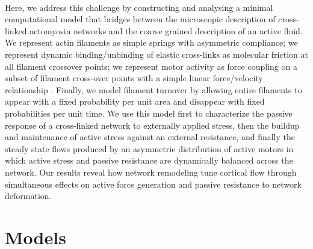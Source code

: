 \documentclass[10pt,letterpaper]{article}
\begin{document}
\paragraph{}  Here, we address this challenge by constructing and analysing a minimal computational model that bridges between the microscopic description of cross-linked actomyosin networks and the coarse grained description of an active fluid.  We represent actin filaments as simple springs with asymmetric compliance; we represent dynamic binding/unbinding of elastic cross-links as molecular friction \cite{theo_friction,theo_frictionSam,theo_molefric} at all filament crossover points; we represent motor activity as force coupling on a subset of filament cross-over points with a simple linear force/velocity relationship \cite{theo_frictionShila}.  Finally, we model filament turnover by allowing entire filaments to appear with a fixed probability per unit area and disappear with fixed probabilities per unit time. We use this model first to characterize the passive response of a cross-linked network to externally applied stress, then the buildup and maintenance of active stress against an external resistance, and finally the steady state flows produced by an asymmetric distribution of active motors in which active stress and passive resistance are dynamically balanced across the network.  Our results reveal how network remodeling tune cortical flow through simultaneous effects on active force generation and passive resistance to network deformation. 
  

\section*{Models}
\end{document}
